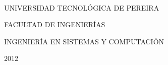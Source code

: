 \documentclass[letterpaper,12pt,oneside,pdftex]{icontec}
\begin{document}
\paragraph{}

\paragraph{}

\paragraph{}
\paragraph{}
\paragraph{}
\begin{center}
UNIVERSIDAD TECNOL\'OGICA DE PEREIRA
\end{center}
\begin{center}
FACULTAD DE INGENIER\'IAS
\end{center}
\begin{center}
INGENIER\'IA EN SISTEMAS Y COMPUTACI\'ON
\end{center}
\begin{center}
2012\\
\end{center}


\frontmatter
\tableofcontents
\mainmatter













\end{document}
